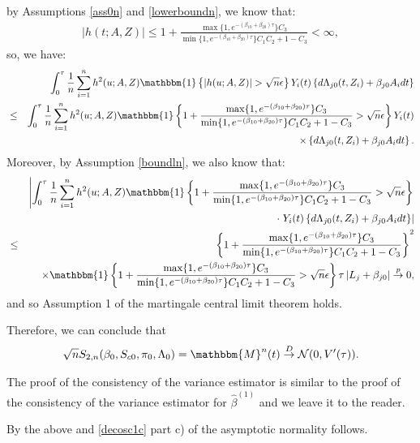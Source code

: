 \documentclass[11pt]{article}
\newcommand{\ee}{\end{eqnarray}}
\newcommand{\eqnn}{\begin{eqnarray*}}
\newcommand{\een}{\end{eqnarray*}}
\newcommand{\be}{\begin{eqnarray}}
\begin{document}
by Assumptions \ref{ass0n} and \ref{lowerboundn}, we know that: 
\eqnn
\left|h(t; A,Z)\right|\leq 1+\frac{\max\{1,e^{-(\beta_{10}+\beta_{20})\tau}\}C_3}{\min\{1,e^{-(\beta_{10}+\beta_{20})\tau}\}C_1C_2+1-C_3}<\infty,
\een
so, we have:
\eqnn
&&\int_0^\tau \frac{1}{n}\sum_{i=1}^n h^2(u ; A,Z) \mathbbm{1}\left\{\left|h(u ; A,Z)\right|>\sqrt{n}\epsilon\right\}Y_i(t)\left\{d\Lambda_{j0}(t, Z_i) + \beta_{j0} A_idt\right\} \\
&\leq& \int_0^\tau \frac{1}{n}\sum_{i=1}^n h^2(u ; A,Z) \mathbbm{1}\left\{1+\frac{\max\{1,e^{-(\beta_{10}+\beta_{20})\tau}\}C_3}{\min\{1,e^{-(\beta_{10}+\beta_{20})\tau}\}C_1C_2+1-C_3}>\sqrt{n}\epsilon\right\}Y_i(t)\nonumber
\\
&&\times\left\{d\Lambda_{j0}(t, Z_i) + \beta_{j0} A_idt\right\}.\nonumber
\een
Moreover, by Assumption \ref{boundln}, we also know that: 
\eqnn
&&\left| \int_0^\tau \frac{1}{n}\sum_{i=1}^n h^2(u ; A,Z) \mathbbm{1}\left\{1+\frac{\max\{1,e^{-(\beta_{10}+\beta_{20})\tau}\}C_3}{\min\{1,e^{-(\beta_{10}+\beta_{20})\tau}\}C_1C_2+1-C_3}>\sqrt{n}\epsilon\right\}\right.\\&&\cdot\left.Y_i(t)\left\{d\Lambda_{j0}(t, Z_i) + \beta_{j0} A_idt\right\}\right| \nonumber\\
 &\leq & \left\{1+\frac{\max\{1,e^{-(\beta_{10}+\beta_{20})\tau}\}C_3}{\min\{1,e^{-(\beta_{10}+\beta_{20})\tau}\}C_1C_2+1-C_3}\right\}^2  \nonumber \\&&\times\mathbbm{1}\left\{1+\frac{\max\{1,e^{-(\beta_{10}+\beta_{20})\tau}\}C_3}{\min\{1,e^{-(\beta_{10}+\beta_{20})\tau}\}C_1C_2+1-C_3}>\sqrt{n}\epsilon\right\}\tau\left|L_j + \beta_{j0} \right| \overset{p}{\rightarrow} 0,
\een
and so Assumption 1 of the martingale central limit theorem holds.
 
Therefore, we can conclude that 
\be\label{normsc1}
\sqrt{n}S_{2,n}(\beta_0, S_{c0}, \pi_0, \Lambda_{0})=\mathbbm{M}^n(t)\overset{D}{\rightarrow}\mathcal{N}(0,V'(\tau)).
\ee

The proof of the consistency of the variance estimator is similar to the proof of the consistency of the variance estimator for $\hat \beta^{(1)}$ and we leave it to the reader.

By the above and \eqref{decosc1c} part c) of the asymptotic normality follows.
\end{document}
